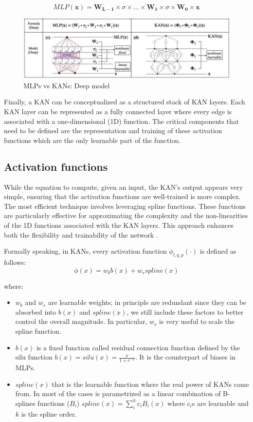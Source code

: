 \documentclass[12pt,a4paper]{article}
\begin{document}
$$MLP(\textbf{x}) = \boldsymbol{W_{L-1}} \times \sigma \times \dots \times \boldsymbol{W_{1}} \times \sigma \times\boldsymbol{W_{0}} \times \textbf{x}$$

\begin{figure}[H]
    \centering
    \includegraphics[width=0.8\linewidth]{Images/B.JPG}
    \caption{ MLPs vs KANs: Deep model }
\end{figure}

Finally, a KAN can be conceptualized as a structured stack of KAN layers. Each KAN layer can be represented as a fully connected layer where every edge is associated with a one-dimensional (1D) function. The critical components that need to be defined are the representation and training of these activation functions which are the only learnable part of the function.

\subsection{Activation functions}
While the equation to compute, given an input, the KAN's output appears very simple, ensuring that the activation functions are well-trained is more complex. The most efficient technique involves leveraging spline functions. These functions are particularly effective for approximating the complexity and the non-linearities of the 1D functions associated with the KAN layers. This approach enhances both the flexibility and trainability of the network \cite{KAN}.

Formally speaking, in KANs, every activation function $\phi_{l,q,p}(\cdot)$ is defined as follows:
$$\phi(x) = w_bb(x) + w_sspline(x) $$

where:
\begin{itemize}
    \item $w_b$ and $w_s$ are learnable weights; in principle are redundant since they can be absorbed into $b(x)$ and $spline(x)$, we still include these factors to better control the overall magnitude. In particular, $w_s$ is very useful to scale the spline function.
    \item $b(x)$ is a fixed function called residual connection function defined by the silu function $b(x) = silu(x) = \frac{x}{1+e^{-x}}$. It is the counterpart of biases in MLPs.
    \item $spline(x)$ that is the learnable function where the real power of KANs came from. In most of the cases is parametrized as a linear combination of B-splines functions ($B_i$) $spline(x)= \sum_i^k c_iB_i(x)$ where $c_i$s are learnable and $k$ is the spline order.
\end{itemize}
\end{document}
